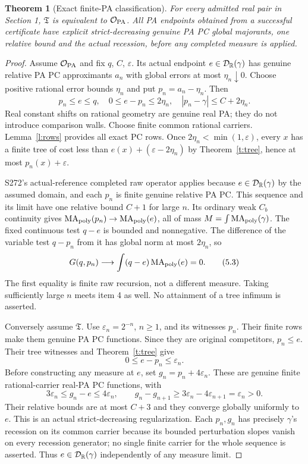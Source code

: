 \documentclass[11pt]{article}
\newtheorem{theorem}{Theorem}[section]
\newcommand{\MA}{\operatorname{MA}_{\rm poly}}\newcommand{\rec}{\operatorname{rec}}
\begin{document}
\begin{theorem}[Exact finite-PA classification]\label{t:pa}
For every admitted real pair in Section 1, $\mathfrak T$ is equivalent to $\mathcal O_{\rm PA}$. All PA endpoints obtained from a successful certificate have explicit strict-decreasing genuine PA PC global majorants, one relative bound and the actual recession, before any completed measure is applied.
\end{theorem}
\begin{proof}
Assume $\mathcal O_{\rm PA}$ and fix $q$, $C$, $\varepsilon$. Its actual endpoint $e\in\mathcal D_\mathbb R(\gamma)$ has genuine relative PA PC approximants $a_n$ with global errors at most $\eta_n\downarrow0$. Choose positive rational error bounds $\eta_n$ and put $p_n=a_n-\eta_n$. Then
\[
    p_n\leq e\leq q,\quad 0\leq e-p_n\leq2\eta_n,\quad
    |p_n-\gamma|\leq C+2\eta_n.                                     \tag{5.2}
\]
Real constant shifts on rational geometry are genuine real PA; they do not introduce comparison walls. Choose finite common rational carriers. Lemma~\ref{l:rows} provides all exact PC rows. Once $2\eta_n<\min(1,\varepsilon)$, every $x$ has a finite tree of cost less than $e(x)+(\varepsilon-2\eta_n)$ by Theorem~\ref{t:tree}, hence at most $p_n(x)+\varepsilon$.

S272's actual-reference completed raw operator applies because $e\in\mathcal D_\mathbb R(\gamma)$ by the assumed domain, and each $p_n$ is finite genuine relative PA PC. This sequence and its limit have one relative bound $C+1$ for large $n$. Its ordinary weak $C_b$ continuity gives $\MA(p_n)\to\MA(e)$, all of mass $M=\int\MA(\gamma)$. The fixed continuous test $q-e$ is bounded and nonnegative. The difference of the variable test $q-p_n$ from it has global norm at most $2\eta_n$, so
\[
 G(q,p_n)\longrightarrow\int(q-e)\MA(e)=0.                          \tag{5.3}
\]
The first equality is finite raw recursion, not a different measure. Taking sufficiently large $n$ meets item 4 as well. No attainment of a tree infimum is asserted.

Conversely assume $\mathfrak T$. Use $\varepsilon_n=2^{-n}$, $n\geq1$, and its witnesses $p_n$. Their finite rows make them genuine PA PC functions. Since they are original competitors, $p_n\leq e$. Their tree witnesses and Theorem~\ref{t:tree} give
\[
                         0\leq e-p_n\leq\varepsilon_n.              \tag{5.4}
\]
Before constructing any measure at $e$, set $g_n=p_n+4\varepsilon_n$. These are genuine finite rational-carrier real-PA PC functions, with
\[
 3\varepsilon_n\leq g_n-e\leq4\varepsilon_n,\qquad
 g_n-g_{n+1}\geq3\varepsilon_n-4\varepsilon_{n+1}
                       =\varepsilon_n>0.                            \tag{5.5}
\]
Their relative bounds are at most $C+3$ and they converge globally uniformly to $e$. This is an actual strict-decreasing regularization. Each $p_n,g_n$ has precisely $\gamma$'s recession on its common carrier because its bounded perturbation slopes vanish on every recession generator; no single finite carrier for the whole sequence is asserted. Thus $e\in\mathcal D_\mathbb R(\gamma)$ independently of any measure limit.


\end{proof}
\end{document}
